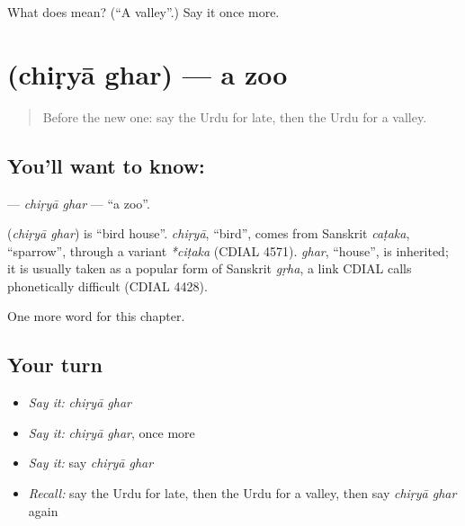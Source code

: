 \begin{tcolorbox}[breakable,colback=teal!4,colframe=teal!35!black,title={Before you move on}]
What does  mean? (\textquotedblleft{}A valley\textquotedblright{}.) Say it once more.
\end{tcolorbox}
\section[\texorpdfstring{\ur{چڑیا} \ur{گھر} (chiṛyā ghar)}{چڑیا گھر (chiṛyā ghar)}]{  (chiṛyā ghar) — a zoo}

\label{lesson:UR-C190-chirya-ghar}



\begin{quote}
Before the new one: say the Urdu for late, then the Urdu for a valley.
\end{quote}

\subsection*{You'll want to know:  }
\textbf{ } — \emph{chiṛyā ghar} — \textquotedblleft{}a zoo\textquotedblright{}.

\begin{cousinweb}
\textbf{ } (\emph{chiṛyā ghar}) is \textquotedblleft{}bird house\textquotedblright{}. \emph{chiṛyā}, \textquotedblleft{}bird\textquotedblright{}, comes from Sanskrit \emph{caṭaka}, \textquotedblleft{}sparrow\textquotedblright{}, through a variant \emph{*ciṭaka} (CDIAL 4571). \emph{ghar}, \textquotedblleft{}house\textquotedblright{}, is inherited; it is usually taken as a popular form of Sanskrit \emph{gṛha}, a link CDIAL calls phonetically difficult (CDIAL 4428).
\end{cousinweb}

\begin{grammarlens}[title={What you've built}]
One more word for this chapter.
\end{grammarlens}

\subsection*{Your turn}
\begin{itemize}
\raggedright
  \item \emph{Say it:} \emph{chiṛyā ghar}
  \item \emph{Say it:} \emph{chiṛyā ghar}, once more
  \item \emph{Say it:} say \emph{chiṛyā ghar}
  \item \emph{Recall:} say the Urdu for late, then the Urdu for a valley, then say \emph{chiṛyā ghar} again
\end{itemize}

